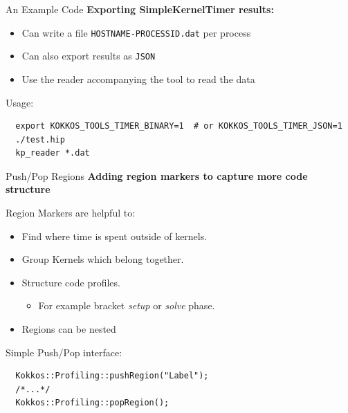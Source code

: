 
\begin{frame}[fragile]{An Example Code}
\textbf{Exporting SimpleKernelTimer results:}

\begin{itemize}
\item Can write a file \texttt{HOSTNAME-PROCESSID.dat} per process
\item Can also export results as \texttt{JSON}
\item Use the reader accompanying the tool to read the data
\end{itemize}

Usage:

\begin{verbatim}
  export KOKKOS_TOOLS_TIMER_BINARY=1  # or KOKKOS_TOOLS_TIMER_JSON=1
  ./test.hip
  kp_reader *.dat
\end{verbatim}

\end{frame}


\begin{frame}[fragile]{Push/Pop Regions}
  \textbf{Adding region markers to capture more code structure}

Region Markers are helpful to:
\begin{itemize}
  \item Find where time is spent outside of kernels.
  \item Group Kernels which belong together.
  \item Structure code profiles.
  \begin{itemize}
     \item For example bracket \textit{setup} or \textit{solve} phase.
  \end{itemize}
  \item Regions can be nested
\end{itemize}

\pause
\vspace{10pt}
Simple Push/Pop interface:
\begin{verbatim}
  Kokkos::Profiling::pushRegion("Label");
  /*...*/
  Kokkos::Profiling::popRegion();
\end{verbatim}
\end{frame}


